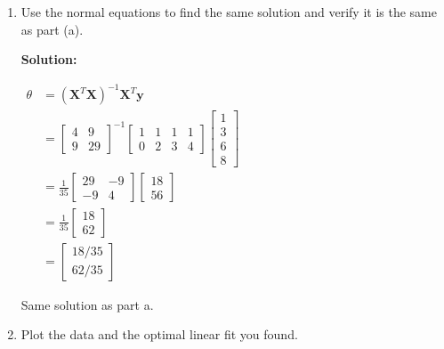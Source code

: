 \documentclass[letter,11pt]{article}
\newenvironment{solution}{
    \vspace{0.16in} {\bf Solution:}
    
}{
	\vspace{0.16in}
}
\begin{document}
\begin{enumerate}
\begin{enumerate}
\begin{solution}
            Hence, $\hat{\theta} = \begin{bmatrix}
                \frac{18}{35} & \frac{62}{35}
            \end{bmatrix}$.
        \end{solution}

        \item Use the normal equations to find the same solution and verify it is the same as part (a).

        \begin{solution}
            $\begin{aligned}
                \theta &= (\textbf{X}^T \textbf{X})^{-1} \textbf{X}^T \textbf{y} \\
                    &= \begin{bmatrix} 4 & 9 \\ 9 & 29 \end{bmatrix}^{-1} \begin{bmatrix} 1 & 1 & 1 & 1 \\ 0 & 2 & 3 & 4 \end{bmatrix} \begin{bmatrix} 1 \\ 3 \\ 6 \\ 8 \end{bmatrix} \\
                    &= \frac{1}{35} \begin{bmatrix} 29 & -9 \\ -9 & 4 \end{bmatrix} \begin{bmatrix} 18 \\ 56 \end{bmatrix} \\
                    &= \frac{1}{35} \begin{bmatrix} 18 \\ 62 \end{bmatrix} \\
                    &= \begin{bmatrix} 18/35 \\ 62/35 \end{bmatrix}
            \end{aligned}$

            Same solution as part a.
        \end{solution}

        \item Plot the data and the optimal linear fit you found.


\end{enumerate}
\end{enumerate}
\end{document}
